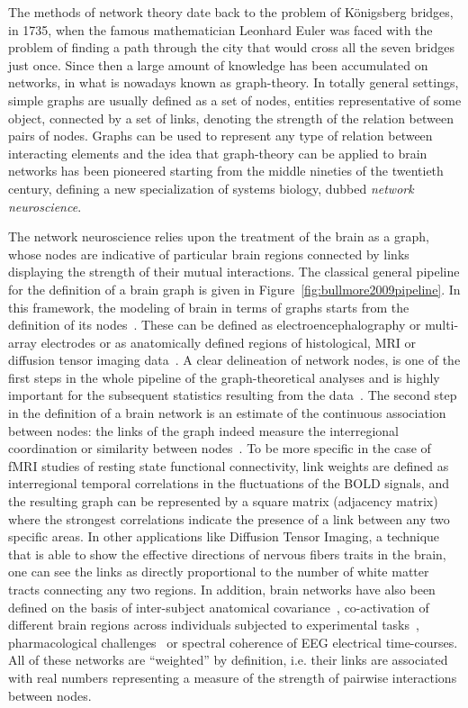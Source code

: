 The methods of network theory date back to the problem of K{\"o}nigsberg bridges, in 1735, when the famous mathematician Leonhard Euler was faced with the problem of finding a path through the city that would cross all the seven bridges just once.
Since then a large amount of knowledge has been accumulated on networks, in what is nowadays known as graph-theory.
In totally general settings, simple graphs are usually defined as a set of nodes, entities representative of some object, connected by a set of links, denoting the strength of the relation between pairs of nodes.
Graphs can be used to represent any type of relation between interacting elements and the idea that graph-theory can be applied to brain networks has been pioneered starting from the middle nineties of the twentieth century, defining a new specialization of systems biology, dubbed \emph{network neuroscience}.

The network neuroscience relies upon the treatment of the brain as a graph, whose nodes are indicative of particular brain regions connected by links displaying the strength of their mutual interactions. The classical general pipeline for the definition of a brain graph is given in Figure~\ref{fig:bullmore2009pipeline}.
In this framework, the modeling of brain in terms of graphs starts from the definition of its nodes~\cite{stanley2013}. These can be defined as electroencephalography or multi-array electrodes or as anatomically defined regions of histological, MRI or diffusion tensor imaging data~\cite{vandenheuvel2010}.
A clear delineation of network nodes, is one of the first steps in the whole pipeline of the graph-theoretical analyses and is highly important for the subsequent statistics resulting from the data~\cite{stanley2013}.
The second step in the definition of a brain network is an estimate of the continuous association between nodes: the links of the graph indeed measure the interregional coordination or similarity between nodes~\cite{pereda2005a}.
To be more specific in the case of fMRI studies of resting state functional connectivity, link weights are defined as interregional temporal correlations in the fluctuations of the BOLD signals, and the resulting graph can be represented by a square matrix (adjacency matrix) where the strongest correlations indicate the presence of a link between any two specific areas.
In other applications like Diffusion Tensor Imaging, a technique that is able to show the effective directions of nervous fibers traits in the brain, one can see the links as directly proportional to the number of white matter tracts connecting any two regions.
In addition, brain networks have also been defined on the basis of inter-subject anatomical covariance~\cite{evans2013,he2007}, co-activation of different brain regions across individuals subjected to experimental tasks~\cite{crossley2013a}, pharmacological challenges~\cite{schwarz2007,schwarz2008} or spectral coherence of EEG electrical time-courses.
All of these networks are ``weighted'' by definition, i.e. their links are associated with real numbers representing a measure of the strength of pairwise interactions between nodes.

